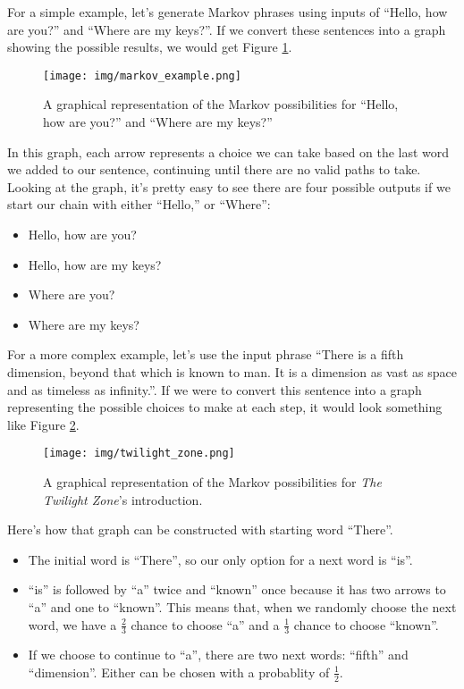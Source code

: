 \documentclass[11pt]{cselabheader}
\begin{document}
For a simple example, let's generate Markov phrases using inputs of ``Hello,
how are you?'' and ``Where are my keys?''. If we convert these sentences into a
graph showing the possible results, we would get Figure \ref{mark_ex}.

\begin{figure}[h]
  \centering
  \texttt{[image: img/markov\_example.png]}
  \caption{A graphical representation of the Markov possibilities for ``Hello,
    how are you?'' and ``Where are my keys?''}
  \label{mark_ex}
\end{figure}

In this graph, each arrow represents a choice we can take based on the last
word we added to our sentence, continuing until there are no valid paths to
take. Looking at the graph, it's pretty easy to see there are four possible
outputs if we start our chain with either ``Hello,'' or ``Where'':

\begin{itemize}
  \item Hello, how are you?
  \item Hello, how are my keys?
  \item Where are you?
  \item Where are my keys?
\end{itemize}

For a more complex example, let's use the input phrase ``There is a fifth
dimension, beyond that which is known to man. It is a dimension as vast as space
and as timeless as infinity.''. If we were to convert this sentence into a graph
representing the possible choices to make at each step, it would look something
like Figure \ref{twilight}.

\begin{figure}[h]
  \centering
  \texttt{[image: img/twilight\_zone.png]}
  \caption{A graphical representation of the Markov possibilities for \emph{The
    Twilight Zone}'s introduction.}
  \label{twilight}
\end{figure}

Here's how that graph can be constructed with starting word ``There''.
\begin{itemize}
  \item The initial word is ``There'', so our only option for a next word is
  ``is''.
  \item ``is'' is followed by ``a'' twice and ``known'' once because it has two
  arrows to ``a'' and one to ``known''. This means that, when we randomly
  choose the next word, we have a $\frac{2}{3}$ chance to choose ``a'' and a
  $\frac{1}{3}$ chance to choose ``known''.
  \item If we choose to continue to ``a'', there are two next words: ``fifth''
  and ``dimension''. Either can be chosen with a probablity of $\frac{1}{2}$.
\end{itemize}
\end{document}

